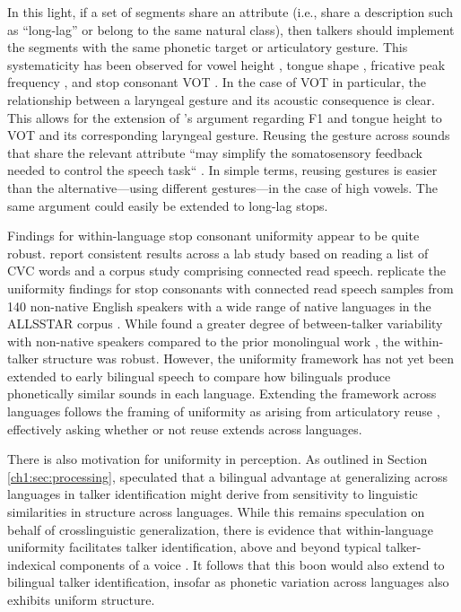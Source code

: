 In this light, if a set of segments share an attribute (i.e., share a description such as ``long-lag'' or belong to the same natural class), then talkers should implement the segments with the same phonetic target or articulatory gesture. This systematicity has been observed for vowel height \citep{menard_2008_invariance}, tongue shape \citep{faytak_2018_uniformity}, fricative peak frequency \citep{chodroff_inpress_sibilant}, and stop consonant VOT \citep{chodroff_2017_structure}. In the case of VOT in particular, the relationship between a laryngeal gesture and its acoustic consequence is clear. This allows for the extension of \citeauthor{menard_2008_invariance}'s \citeyearpar{menard_2008_invariance} argument regarding F1 and tongue height to VOT and its corresponding laryngeal gesture. Reusing the gesture across sounds that share the relevant attribute ``may simplify the somatosensory feedback needed to control the speech task`` \citep[][p. 26]{menard_2008_invariance}. In simple terms, reusing gestures is easier than the alternative---using different gestures---in the case of high vowels. The same argument could easily be extended to long-lag stops.

Findings for within-language stop consonant uniformity appear to be quite robust. \citet{chodroff_2017_structure} report consistent results across a lab study based on reading a list of CVC words and a corpus study comprising connected read speech. \citet{chodroff_2019_l2} replicate the uniformity findings for stop consonants with connected read speech samples from 140 non-native English speakers with a wide range of native languages in the ALLSSTAR corpus \citep{bradlow_2011_allsstar}. While \citet{chodroff_2019_l2} found a greater degree of between-talker variability with non-native speakers compared to the prior monolingual work \citep{chodroff_2017_structure}, the within-talker structure was robust. However, the uniformity framework has not yet been extended to early bilingual speech to compare how bilinguals produce phonetically similar sounds in each language. Extending the framework across languages follows the framing of uniformity as arising from articulatory reuse \citep{faytak_2018_uniformity}, effectively asking whether or not reuse extends across languages.

There is also motivation for uniformity in perception. As outlined in Section \ref{ch1:sec:processing}, \citet{orena_2019_identifying} speculated that a bilingual advantage at generalizing across languages in talker identification might derive from sensitivity to linguistic similarities in structure across languages. While this remains speculation on behalf of crosslinguistic generalization, there is evidence that within-language uniformity facilitates talker identification, above and beyond typical talker-indexical components of a voice \citep{ganugapati_2019_structured}. It follows that this boon would also extend to bilingual talker identification, insofar as phonetic variation across languages also exhibits uniform structure. 

